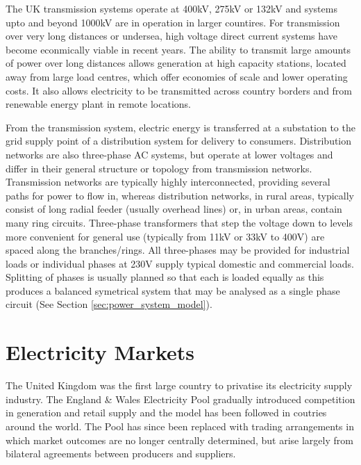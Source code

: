 The UK transmission systems operate at 400kV, 275kV or 132kV and systems upto
and beyond 1000kV are in operation in larger countires.  For transmission over
very long distances or undersea, high voltage direct current systems have
become econmically viable in recent years.  The ability to transmit large
amounts of power over long distances allows generation at high capacity
stations, located away from large load centres, which offer economies of scale
and lower operating costs.  It also allows electricity to be transmitted
across country borders and from renewable energy plant in remote locations.

From the transmission system, electric energy is transferred at a substation to
the grid supply point of a distribution system for delivery to consumers.
Distribution networks are also three-phase AC systems, but operate at lower
voltages and differ in their general structure or topology from transmission
networks.  Transmission networks are typically highly interconnected, providing
several paths for power to flow in, whereas distribution networks, in rural
areas, typically consist of long radial feeder (usually overhead lines) or, in
urban areas, contain many ring circuits.  Three-phase transformers that step the
voltage down to levels more convenient for general use (typically from 11kV or
33kV to 400V) are spaced along the branches/rings.  All three-phases may be
provided for industrial loads or individual phases at 230V supply typical
domestic and commercial loads.  Splitting of phases is usually planned so that
each is loaded equally as this produces a balanced symetrical system that may
be analysed as a single phase circuit (See Section
\ref{sec:power_system_model}).

\section{Electricity Markets}
The United Kingdom was the first large country to privatise its electricity
supply industry.  The England \& Wales Electricity Pool gradually introduced
competition in generation and retail supply and the model has been followed in
coutries around the world.  The Pool has since been replaced with trading
arrangements in which market outcomes are no longer centrally determined, but
arise largely from bilateral agreements between producers and suppliers.

